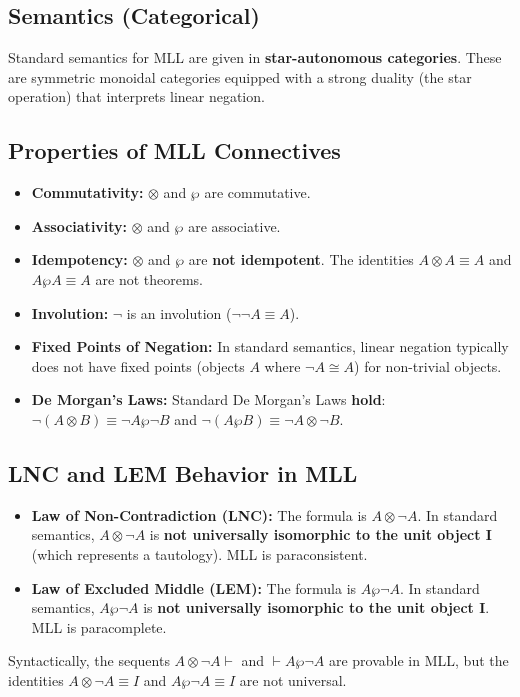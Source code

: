 \documentclass{article}
\begin{document}
	\subsection{Semantics (Categorical)}
	Standard semantics for MLL are given in \textbf{star-autonomous categories}. These are symmetric monoidal categories equipped with a strong duality (the star operation) that interprets linear negation.
	
	\subsection{Properties of MLL Connectives}
	\begin{itemize}
		\item \textbf{Commutativity:} \(\otimes\) and \(\wp\) are commutative.
		\item \textbf{Associativity:} \(\otimes\) and \(\wp\) are associative.
		\item \textbf{Idempotency:} \(\otimes\) and \(\wp\) are \textbf{not idempotent}. The identities \(A \otimes A \equiv A\) and \(A \wp A \equiv A\) are not theorems.
		\item \textbf{Involution:} \(\neg\) is an involution (\(\neg \neg A \equiv A\)).
		\item \textbf{Fixed Points of Negation:} In standard semantics, linear negation typically does not have fixed points (objects \(A\) where \(\neg A \cong A\)) for non-trivial objects.
		\item \textbf{De Morgan's Laws:} Standard De Morgan's Laws \textbf{hold}: \(\neg(A \otimes B) \equiv \neg A \wp \neg B\) and \(\neg(A \wp B) \equiv \neg A \otimes \neg B\).
	\end{itemize}
	
	\subsection{LNC and LEM Behavior in MLL}
	\begin{itemize}
		\item \textbf{Law of Non-Contradiction (LNC):} The formula is \(A \otimes \neg A\). In standard semantics, \(A \otimes \neg A\) is \textbf{not universally isomorphic to the unit object I} (which represents a tautology). MLL is paraconsistent.
		\item \textbf{Law of Excluded Middle (LEM):} The formula is \(A \wp \neg A\). In standard semantics, \(A \wp \neg A\) is \textbf{not universally isomorphic to the unit object I}. MLL is paracomplete.
	\end{itemize}
	Syntactically, the sequents \(A \otimes \neg A \vdash\) and \(\vdash A \wp \neg A\) are provable in MLL, but the identities \(A \otimes \neg A \equiv I\) and \(A \wp \neg A \equiv I\) are not universal.
	
\end{document}
